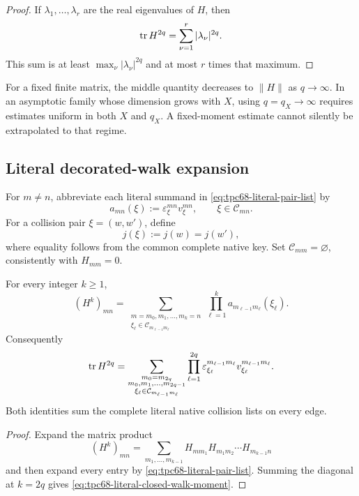 \begin{proof}
If \(\lambda_1,\ldots,\lambda_r\) are the real eigenvalues of \(H\), then
\[
 \operatorname{tr} H^{2q}=\sum_{\nu=1}^r|\lambda_\nu|^{2q}.
\]
This sum is at least \(\max_\nu|\lambda_\nu|^{2q}\) and at most \(r\)
times that maximum.
\end{proof}

For a fixed finite matrix, the middle quantity decreases to \(\|H\|\) as
\(q\to\infty\).  In an asymptotic family whose dimension grows with \(X\),
using \(q=q_X\to\infty\) requires estimates uniform in both \(X\) and
\(q_X\).  A fixed-moment estimate cannot silently be extrapolated to that
regime.

\subsection{Literal decorated-walk expansion}

For \(m\ne n\), abbreviate each literal summand in
\eqref{eq:tpc68-literal-pair-list} by
\[
 a_{mn}(\xi):=\varepsilon_\xi^{mn}v_\xi^{mn},
 \qquad \xi\in\mathcal C_{mn}.
\]
For a collision pair \(\xi=(w,w')\), define
\[
 j(\xi):=j(w)=j(w'),
\]
where equality follows from the common complete native key.
Set \(\mathcal C_{mm}=\varnothing\), consistently with \(H_{mm}=0\).

\begin{proposition}
\label{prop:tpc68-decorated-walk}
For every integer \(k\ge1\),
\begin{equation}
 (H^k)_{mn}
 =
 \sum_{\substack{m=m_0,m_1,\ldots,m_k=n\\
                 \xi_\ell\in\mathcal C_{m_{\ell-1}m_\ell}}}
 \prod_{\ell=1}^k
 a_{m_{\ell-1}m_\ell}(\xi_\ell).
 \label{eq:tpc68-decorated-walk-expansion}
\end{equation}
Consequently
\begin{equation}
 \operatorname{tr} H^{2q}
 =
 \sum_{\substack{m_0=m_{2q}\\
                 m_0,m_1,\ldots,m_{2q-1}\\
                 \xi_\ell\in\mathcal C_{m_{\ell-1}m_\ell}}}
 \prod_{\ell=1}^{2q}
 \varepsilon_{\xi_\ell}^{m_{\ell-1}m_\ell}
 v_{\xi_\ell}^{m_{\ell-1}m_\ell}.
 \label{eq:tpc68-literal-closed-walk-moment}
\end{equation}
Both identities sum the complete literal native collision lists on every
edge.
\end{proposition}

\begin{proof}
Expand the matrix product
\[
 (H^k)_{mn}
 =\sum_{m_1,\ldots,m_{k-1}}
 H_{mm_1}H_{m_1m_2}\cdots H_{m_{k-1}n}
\]
and then expand every entry by
\eqref{eq:tpc68-literal-pair-list}.  Summing the diagonal at \(k=2q\)
gives \eqref{eq:tpc68-literal-closed-walk-moment}.
\end{proof}

